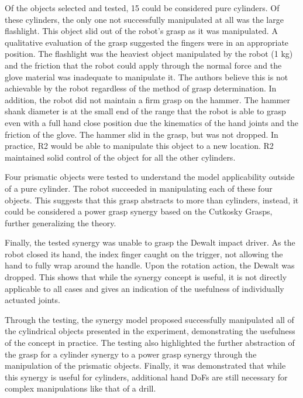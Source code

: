 \documentclass[runningheads,a4paper]{llncs}
\begin{document}
Of the objects selected and tested, 15 could be considered pure cylinders. Of these cylinders, the only one not successfully manipulated at all was the large flashlight. This object slid out of the robot's grasp as it was manipulated. A qualitative evaluation of the grasp suggested the fingers were in an appropriate position. The flashlight was the heaviest object manipulated by the robot (1 kg) and the friction that the robot could apply through the normal force and the glove material was inadequate to manipulate it. The authors believe this is not achievable by the robot regardless of the method of grasp determination. In addition, the robot did not maintain a firm grasp on the hammer. The hammer shank diameter is at the small end of the range that the robot is able to grasp even with a full hand close position due the kinematics of the hand joints and the friction of the glove. The hammer slid in the grasp, but was not dropped. In practice, R2 would be able to manipulate this object to a new location. R2 maintained solid control of the object for all the other cylinders. 

Four prismatic objects were tested to understand the model applicability outside of a pure cylinder. The robot succeeded in manipulating each of these four objects. This suggests that this grasp abstracts to more than cylinders, instead, it could be considered a power grasp synergy based on the Cutkosky Grasps, further generalizing the theory. 

Finally, the tested synergy was unable to grasp the Dewalt impact driver. As the robot closed its hand, the index finger caught on the trigger, not allowing the hand to fully wrap around the handle. Upon the rotation action, the Dewalt was dropped. This shows that while the synergy concept is useful, it is not directly applicable to all cases and gives an indication of the usefulness of individually actuated joints. 

Through the testing, the synergy model proposed successfully manipulated all of the cylindrical objects presented in the experiment, demonstrating the usefulness of the concept in practice. The testing also highlighted the further abstraction of the grasp for a cylinder synergy to a power grasp synergy through the manipulation of the prismatic objects. Finally, it was demonstrated that while this synergy is useful for cylinders, additional hand DoFs are still necessary for complex manipulations like that of a drill.

\end{document}

